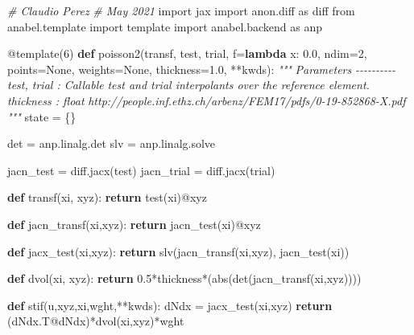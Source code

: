 \documentclass[
  11pt,
]{article}
\newenvironment{Shaded}{}{}
\newcommand{\AttributeTok}[1]{\textcolor[rgb]{0.49,0.56,0.16}{#1}}
\newcommand{\BuiltInTok}[1]{#1}
\newcommand{\CommentTok}[1]{\textcolor[rgb]{0.38,0.63,0.69}{\textit{#1}}}
\newcommand{\ControlFlowTok}[1]{\textcolor[rgb]{0.00,0.44,0.13}{\textbf{#1}}}
\newcommand{\DecValTok}[1]{\textcolor[rgb]{0.25,0.63,0.44}{#1}}
\newcommand{\FloatTok}[1]{\textcolor[rgb]{0.25,0.63,0.44}{#1}}
\newcommand{\ImportTok}[1]{#1}
\newcommand{\KeywordTok}[1]{\textcolor[rgb]{0.00,0.44,0.13}{\textbf{#1}}}
\newcommand{\NormalTok}[1]{#1}
\newcommand{\OperatorTok}[1]{\textcolor[rgb]{0.40,0.40,0.40}{#1}}
\newcommand{\VariableTok}[1]{\textcolor[rgb]{0.10,0.09,0.49}{#1}}
\begin{document}
\begin{Shaded}
\begin{Highlighting}[]
\CommentTok{\# Claudio Perez}
\CommentTok{\# May 2021}
\ImportTok{import}\NormalTok{ jax}
\ImportTok{import}\NormalTok{ anon.diff }\ImportTok{as}\NormalTok{ diff}
\ImportTok{from}\NormalTok{ anabel.template }\ImportTok{import}\NormalTok{ template}
\ImportTok{import}\NormalTok{ anabel.backend }\ImportTok{as}\NormalTok{ anp}


\AttributeTok{@template}\NormalTok{(}\DecValTok{6}\NormalTok{)}
\KeywordTok{def}\NormalTok{ poisson2(transf, test, trial, f}\OperatorTok{=}\KeywordTok{lambda}\NormalTok{ x: }\FloatTok{0.0}\NormalTok{, ndim}\OperatorTok{=}\DecValTok{2}\NormalTok{, points}\OperatorTok{=}\VariableTok{None}\NormalTok{, weights}\OperatorTok{=}\VariableTok{None}\NormalTok{, thickness}\OperatorTok{=}\FloatTok{1.0}\NormalTok{, }\OperatorTok{**}\NormalTok{kwds):}
    \CommentTok{"""}
\CommentTok{    Parameters}
\CommentTok{    {-}{-}{-}{-}{-}{-}{-}{-}{-}{-}}
\CommentTok{    test, trial : Callable}
\CommentTok{        test and trial interpolants over the reference element.}
\CommentTok{    thickness : float}
\CommentTok{    }
\CommentTok{    http://people.inf.ethz.ch/arbenz/FEM17/pdfs/0{-}19{-}852868{-}X.pdf}
\CommentTok{    """}
\NormalTok{    state }\OperatorTok{=}\NormalTok{ \{\}}
    
\NormalTok{    det }\OperatorTok{=}\NormalTok{ anp.linalg.det}
\NormalTok{    slv }\OperatorTok{=}\NormalTok{ anp.linalg.solve}
    
\NormalTok{    jacn\_test }\OperatorTok{=}\NormalTok{ diff.jacx(test)}
\NormalTok{    jacn\_trial }\OperatorTok{=}\NormalTok{ diff.jacx(trial)}
    
    \KeywordTok{def}\NormalTok{ transf(xi, xyz):}
        \ControlFlowTok{return}\NormalTok{ test(xi)}\OperatorTok{@}\NormalTok{xyz}
    
    \KeywordTok{def}\NormalTok{ jacn\_transf(xi,xyz):}
        \ControlFlowTok{return}\NormalTok{ jacn\_test(xi)}\OperatorTok{@}\NormalTok{xyz}
    
    \KeywordTok{def}\NormalTok{ jacx\_test(xi,xyz): }
        \ControlFlowTok{return}\NormalTok{ slv(jacn\_transf(xi,xyz), jacn\_test(xi))}
    
    \KeywordTok{def}\NormalTok{ dvol(xi, xyz): }
        \ControlFlowTok{return} \FloatTok{0.5}\OperatorTok{*}\NormalTok{thickness}\OperatorTok{*}\NormalTok{(}\BuiltInTok{abs}\NormalTok{(det(jacn\_transf(xi,xyz))))}
    
    \KeywordTok{def}\NormalTok{ stif(u,xyz,xi,wght,}\OperatorTok{**}\NormalTok{kwds):}
\NormalTok{        dNdx }\OperatorTok{=}\NormalTok{ jacx\_test(xi,xyz)}
        \ControlFlowTok{return}\NormalTok{ (dNdx.T}\OperatorTok{@}\NormalTok{dNdx)}\OperatorTok{*}\NormalTok{dvol(xi,xyz)}\OperatorTok{*}\NormalTok{wght}
    

\end{Highlighting}
\end{Shaded}
\end{document}
